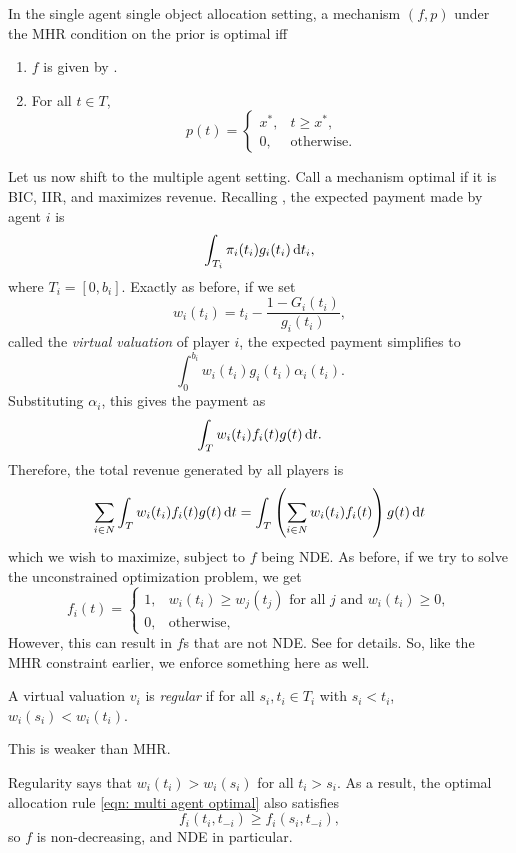 		\begin{ftheo}
			In the single agent single object allocation setting, a mechanism $(f,p)$ under the MHR condition on the prior is optimal iff
			\begin{enumerate}
				\item $f$ is given by .
				\item For all $t \in T$,
				\[ p(t) = \begin{cases} x^*, & t \ge x^*, \\ 0, & \text{otherwise.} \end{cases} \]
			\end{enumerate}
		\end{ftheo}

		Let us now shift to the multiple agent setting. Call a mechanism optimal if it is BIC, IIR, and maximizes revenue. Recalling , the expected payment made by agent $i$ is
		\[ \int_{T_i} \pi_i(t_i) g_i(t_i) \dif t_i, \]
		where $T_i = [0,b_i]$. Exactly as before, if we set
		\[ w_i(t_i) = t_i - \frac{1-G_i(t_i)}{g_i(t_i)}, \]
		called the \emph{virtual valuation} of player $i$, the expected payment simplifies to
		\[ \int_0^{b_i} w_i(t_i) g_i(t_i) \alpha_i(t_i). \]
		Substituting $\alpha_{i}$, this gives the payment as
		\[ \int_T w_i(t_i) f_i(t) g(t) \dif t. \]
		Therefore, the total revenue generated by all players is
		\[ \sum_{i \in N} \int_{T} w_i(t_i) f_i(t) g(t) \dif t = \int_{T} \left(\sum_{i \in N} w_i(t_i) f_i(t)\right) g(t) \dif t \]
		which we wish to maximize, subject to $f$ being NDE. As before, if we try to solve the unconstrained optimization problem, we get
		\begin{equation}
			\label{eqn: multi agent optimal}
			f_i(t) = \begin{cases} 1, & w_i(t_i) \ge w_j(t_j) \text{ for all $j$ and $w_i(t_i) \ge 0$}, \\ 0, & \text{otherwise,} \end{cases}
		\end{equation}
		However, this can result in $f$s that are not NDE. See \cite{myerson} for details. So, like the MHR constraint earlier, we enforce something here as well.

		\begin{fdef}
			A virtual valuation $v_i$ is \emph{regular} if for all $s_i,t_i \in T_i$ with $s_i < t_i$, $w_i(s_i) < w_i(t_i)$.
		\end{fdef}
		This is weaker than MHR.

		Regularity says that $w_i(t_i) > w_i(s_i)$ for all $t_i > s_i$. As a result, the optimal allocation rule \cref{eqn: multi agent optimal} also satisfies
		\[ f_i(t_i,t_{-i}) \ge f_i(s_i,t_{-i}), \]
		so $f$ is non-decreasing, and NDE in particular.
		
